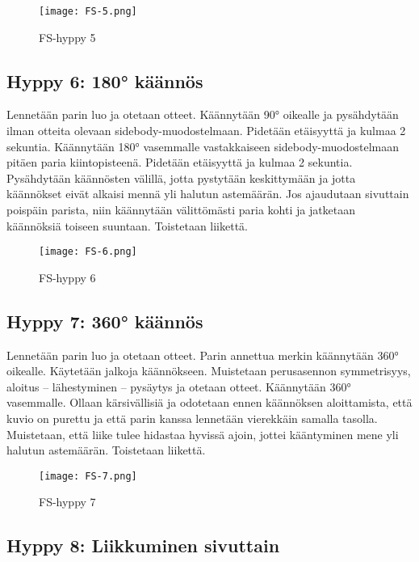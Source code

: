 \begin{figure*}[]\centering\texttt{[image: FS-5.png]}\caption{FS-hyppy 5}\end{figure*} 

\subsection{ Hyppy 6: 180° käännös }
\label{fs-kuviohyppaaminen-hyppy-6-180deg-kaannos}


Lennetään parin luo ja otetaan otteet. Käännytään 90° oikealle ja pysähdytään ilman otteita olevaan sidebody-muodostelmaan. Pidetään etäisyyttä ja kulmaa 2 sekuntia. Käännytään 180° vasemmalle vastakkaiseen sidebody-muodostelmaan pitäen paria kiintopisteenä. Pidetään etäisyyttä ja kulmaa 2 sekuntia. Pysähdytään käännösten välillä, jotta pystytään keskittymään ja jotta käännökset eivät alkaisi mennä yli halutun astemäärän. Jos ajaudutaan sivuttain poispäin parista, niin käännytään välittömästi paria kohti ja jatketaan käännöksiä toiseen suuntaan. Toistetaan liikettä. 


\begin{figure*}[]\centering\texttt{[image: FS-6.png]}\caption{FS-hyppy 6}\end{figure*} 

\subsection{ Hyppy 7: 360° käännös }
\label{fs-kuviohyppaaminen-hyppy-7-360deg-kaannos}


Lennetään parin luo ja otetaan otteet. Parin annettua merkin käännytään 360° oikealle. Käytetään jalkoja käännökseen. Muistetaan perusasennon symmetrisyys, aloitus – lähestyminen – pysäytys ja otetaan otteet. Käännytään 360° vasemmalle. Ollaan kärsivällisiä ja odotetaan ennen käännöksen aloittamista, että kuvio on purettu ja että parin kanssa lennetään vierekkäin samalla tasolla. Muistetaan, että liike tulee hidastaa hyvissä ajoin, jottei kääntyminen mene yli halutun astemäärän. Toistetaan liikettä. 


\begin{figure*}[]\centering\texttt{[image: FS-7.png]}\caption{FS-hyppy 7}\end{figure*} 

\subsection{ Hyppy 8: Liikkuminen sivuttain }
\label{fs-kuviohyppaaminen-hyppy-8-liikkuminen-sivuttain}


